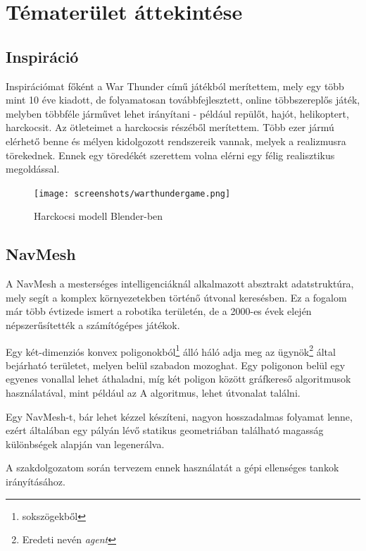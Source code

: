 \documentclass[
]{thesis-ekf}
\theoremstyle{definition}
\theoremstyle{remark}
\begin{document}
\chapter{Tématerület áttekintése}

\section{Inspiráció}

Inspirációmat főként a War Thunder\cite{warthunder} című játékból merítettem, mely egy több mint 10 éve kiadott, de folyamatosan továbbfejlesztett, online többszereplős játék, melyben többféle járművet lehet irányítani - például repülőt, hajót, helikoptert, harckocsit. Az ötleteimet a harckocsis részéből merítettem. Több ezer jármú elérhető benne és mélyen kidolgozott rendszereik vannak, melyek a realizmusra törekednek. Ennek egy töredékét szerettem volna elérni egy félig realisztikus megoldással.


\begin{figure}[H]
    \centering
    \texttt{[image: screenshots/warthundergame.png]}
    \caption{Harckocsi modell Blender-ben}
    \label{fig:warthundergame}
\end{figure}


\section{NavMesh}

A NavMesh\cite{navmesh} a mesterséges intelligenciáknál alkalmazott absztrakt adatstruktúra, mely segít a komplex környezetekben történő útvonal keresésben. Ez a fogalom már több évtizede ismert a robotika területén, de a 2000-es évek elején népszerűsítették a számítógépes játékok.

Egy két-dimenziós konvex poligonokból\footnote{sokszögekből} álló háló adja meg az ügynök\footnote{Eredeti nevén \emph{agent}} által bejárható területet, melyen belül szabadon mozoghat. Egy poligonon belül egy egyenes vonallal lehet áthaladni, míg két poligon között gráfkereső algoritmusok használatával, mint például az A\* algoritmus, lehet útvonalat találni.

Egy NavMesh-t, bár lehet kézzel készíteni, nagyon hosszadalmas folyamat lenne, ezért általában egy pályán lévő statikus geometriában található magasság különbségek alapján van legenerálva.

A szakdolgozatom során tervezem ennek használatát a gépi ellenséges tankok irányításához.
\end{document}
